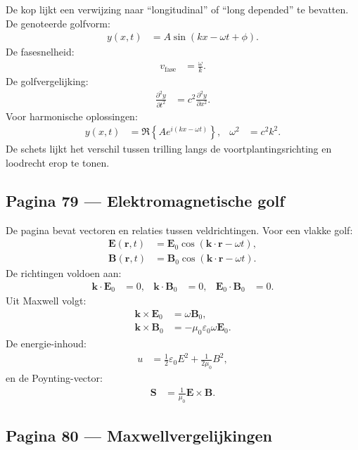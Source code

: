 \documentclass[11pt]{article}
\newcommand{\pd}[2]{\frac{\partial #1}{\partial #2}}
\newcommand{\vect}[1]{\mathbf{#1}}
\begin{document}
De kop lijkt een verwijzing naar ``longitudinal'' of ``long depended'' te bevatten. De genoteerde golfvorm:
\begin{align*}
y(x,t)
&=
A\sin(kx-\omega t+\phi).
\end{align*}
De fasesnelheid:
\begin{align*}
v_\mathrm{fase}
&=
\frac{\omega}{k}.
\end{align*}
De golfvergelijking:
\begin{align*}
\pd{^2 y}{t^2}
&=
c^2\pd{^2 y}{x^2}.
\end{align*}
Voor harmonische oplossingen:
\begin{align*}
y(x,t)
&=
\Re\left\{A e^{i(kx-\omega t)}\right\},
&
\omega^2&=c^2k^2.
\end{align*}
De schets lijkt het verschil tussen trilling langs de voortplantingsrichting en loodrecht erop te tonen.

\subsection*{Pagina 79 --- Elektromagnetische golf}

De pagina bevat vectoren en relaties tussen veldrichtingen. Voor een vlakke golf:
\begin{align*}
\vect{E}(\vect{r},t)
&=
\vect{E}_0\cos(\vect{k}\cdot\vect{r}-\omega t),\\
\vect{B}(\vect{r},t)
&=
\vect{B}_0\cos(\vect{k}\cdot\vect{r}-\omega t).
\end{align*}
De richtingen voldoen aan:
\begin{align*}
\vect{k}\cdot\vect{E}_0&=0,
&
\vect{k}\cdot\vect{B}_0&=0,
&
\vect{E}_0\cdot\vect{B}_0&=0.
\end{align*}
Uit Maxwell volgt:
\begin{align*}
\vect{k}\times\vect{E}_0
&=
\omega\vect{B}_0,\\
\vect{k}\times\vect{B}_0
&=
-\mu_0\varepsilon_0\omega\vect{E}_0.
\end{align*}
De energie-inhoud:
\begin{align*}
u
&=
\frac{1}{2}\varepsilon_0 E^2
+
\frac{1}{2\mu_0}B^2,
\end{align*}
en de Poynting-vector:
\begin{align*}
\vect{S}
&=
\frac{1}{\mu_0}\vect{E}\times\vect{B}.
\end{align*}

\subsection*{Pagina 80 --- Maxwellvergelijkingen}
\end{document}
